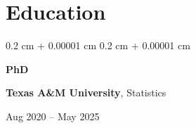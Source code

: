 \documentclass[10pt, letterpaper]{article}
\newenvironment{highlights}{
	\begin{itemize}[
		topsep=0.10 cm,
		parsep=0.10 cm,
		partopsep=0pt,
		itemsep=0pt,
		leftmargin=0.4 cm + 10pt
		]
	}{
	\end{itemize}
} %
\newenvironment{highlightsforbulletentries}{
	\begin{itemize}[
		topsep=0.10 cm,
		parsep=0.10 cm,
		partopsep=0pt,
		itemsep=0pt,
		leftmargin=10pt
		]
	}{
	\end{itemize}
} %
\newenvironment{onecolentry}{
	\begin{adjustwidth}{
			0.2 cm + 0.00001 cm
		}{
			0.2 cm + 0.00001 cm
		}
	}{
	\end{adjustwidth}
} %
\newenvironment{threecolentry}[3][]{
	\onecolentry
	\def\thirdColumn{#3}
	\setcolumnwidth{1 cm, \fill, 4.5 cm}
	\begin{paracol}{3}
		{\raggedright #2} \switchcolumn
	}{
		\switchcolumn \raggedleft \thirdColumn
	\end{paracol}
	\endonecolentry
} %
\let\hrefWithoutArrow\href
\renewcommand{\href}[2]{\hrefWithoutArrow{#1}{\ifthenelse{\equal{#2}{}}{ }{#2 }\raisebox{.15ex}{\footnotesize \faExternalLink*}}}
\begin{document}
	
%	
%	
%	
%	
%	
%	
%	
%	
%	
%	
%			
%			
%			
%			
%			
%			
%			
	
	\section{Education}
	
	
	
	
	\begin{threecolentry}{\textbf{PhD}}{
			Aug 2020 – May 2025
		}
		\textbf{Texas A\&M University}, Statistics
	\end{threecolentry}
\end{document}

